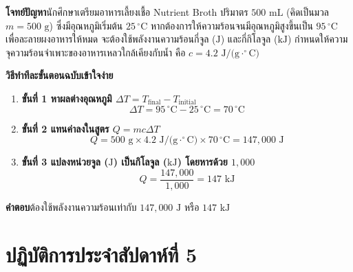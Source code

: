 \vspace{4pt}


\begin{worked}
\textbf{โจทย์ปัญหา}\quad นักศึกษาเตรียมอาหารเลี้ยงเชื้อ Nutrient Broth ปริมาตร $500\text{ mL}$ (คิดเป็นมวล $m = 500\text{ g}$) ซึ่งมีอุณหภูมิเริ่มต้น $25\,^\circ\text{C}$ หากต้องการให้ความร้อนจนมีอุณหภูมิสูงขึ้นเป็น $95\,^\circ\text{C}$ เพื่อละลายผงอาหารให้หมด จะต้องใช้พลังงานความร้อนกี่จูล ($\text{J}$) และกี่กิโลจูล ($\text{kJ}$) กำหนดให้ความจุความร้อนจำเพาะของอาหารเหลวใกล้เคียงกับน้ำ คือ $c = 4.2\text{ J/(g}\cdot^\circ\text{C)}$

\textbf{วิธีทำทีละขั้นตอนฉบับเข้าใจง่าย}
\begin{enumerate}
    \item \textbf{ขั้นที่ 1 หาผลต่างอุณหภูมิ $\Delta T = T_{\text{final}} - T_{\text{initial}}$}
    \[
        \Delta T = 95\,^\circ\text{C} - 25\,^\circ\text{C} = 70\,^\circ\text{C}
    \]
    \item \textbf{ขั้นที่ 2 แทนค่าลงในสูตร $Q = m c \Delta T$}
    \[
        Q = 500\text{ g} \times 4.2\text{ J/(g}\cdot^\circ\text{C)} \times 70\,^\circ\text{C} = 147{,}000\text{ J}
    \]
    \item \textbf{ขั้นที่ 3 แปลงหน่วยจูล ($\text{J}$) เป็นกิโลจูล ($\text{kJ}$) โดยหารด้วย $1{,}000$}
    \[
        Q = \frac{147{,}000}{1{,}000} = 147\text{ kJ}
    \]
\end{enumerate}
\textbf{คำตอบ}\quad ต้องใช้พลังงานความร้อนเท่ากับ $147{,}000\text{ J}$ หรือ $147\text{ kJ}$
\end{worked}

\section{ปฏิบัติการประจำสัปดาห์ที่ 5}


